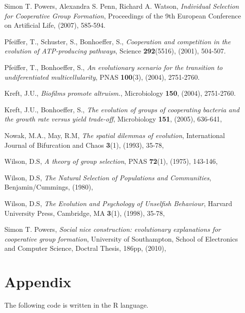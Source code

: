 \documentclass[a4paper,10pt, twocolumn]{article}
\begin{document}
\newpage
\onecolumn
\begin{thebibliography}{9}

  Simon T. Powers, Alexandra S. Penn, Richard A. Watson,
  \emph{Individual Selection for Cooperative Group Formation},
  Proceedings of the 9th European Conference on Artificial Life,
  (2007),
  585-594.
  
  Pfeiffer, T., Schuster, S., Bonhoeffer, S.,
  \emph{Cooperation and competition in the evolution of ATP-producing pathways},
  Science \textbf{292}(5516),
  (2001),
  504-507.

  Pfeiffer, T., Bonhoeffer, S.,
  \emph{An evolutionary scenario for the transition to undiferentiated multicellularity},
  PNAS \textbf{100}(3),
  (2004),
  2751-2760.
  
  Kreft, J.U., 
  \emph{Biofilms promote altruism.},
  Microbiology \textbf{150},
  (2004),
  2751-2760.
  
  Kreft, J.U., Bonhoeffer, S.,
  \emph{The evolution of groups of cooperating bacteria and the growth rate versus yield trade-off},
  Microbiology \textbf{151},
  (2005),
  636-641,
  
  Nowak, M.A., May, R.M,
  \emph{The spatial dilemmas of evolution},
  International Journal of Bifurcation and Chaos \textbf{3}(1),
  (1993),
  35-78,

  Wilson, D.S,
  \emph{A theory of group selection},
  PNAS \textbf{72}(1),
  (1975),
  143-146,
  
  Wilson, D.S,
  \emph{The Natural Selection of Populations and Communities},
  Benjamin/Cummings,
  (1980),
  
  Wilson, D.S,
  \emph{The Evolution and Psychology of Unselfish Behaviour},
  Harvard University Press, Cambridge, MA \textbf{3}(1),
  (1998),
  35-78,    
 
  
  Simon T. Powers,
  \emph{Social nice construction: evolutionary explanations for cooperative group formation},
  University of Southampton, School of Electronics and Computer Science,
  Doctral Thesis, 
  186pp,
  (2010),
  
\end{thebibliography}
\section{Appendix}
The following code is written in the R language. 
\end{document}
